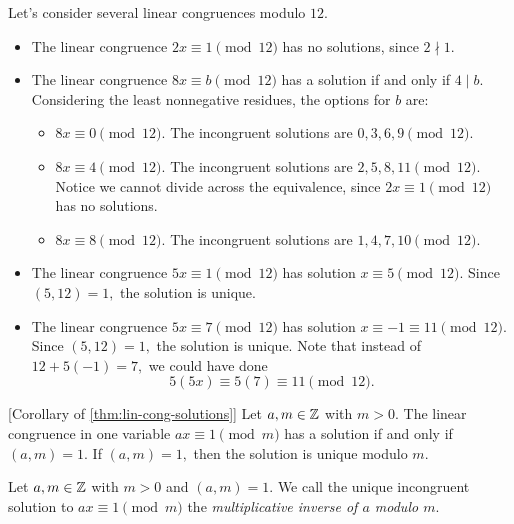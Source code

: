 \documentclass{ximera}
\begin{document}
\begin{example} 
	Let's consider several linear congruences modulo $12.$
	\begin{itemize}
		\item The linear congruence $2x\equiv 1\pmod{12}$ has no solutions, since $2\nmid1.$
		\item The linear congruence $8x\equiv b \pmod{12}$ has a solution if and only if $4\mid b$. Considering the least nonnegative residues, the options for $b$ are:
			\begin{itemize}
			\item $8x\equiv 0\pmod{12}.$ The incongruent solutions are $0,3,6,9\pmod{12}.$
			\item $8x\equiv 4\pmod{12}.$ The incongruent solutions are $2,5,8,11\pmod{12}.$ Notice we cannot divide across the equivalence, since $2x\equiv 1\pmod{12}$ has no solutions. 
			\item $8x\equiv 8\pmod{12}.$ The incongruent solutions are $1,4,7,10\pmod{12}.$ 
			\end{itemize}
		\item The linear congruence $5x\equiv 1 \pmod{12}$ has solution $x\equiv 5\pmod{12}.$ Since $(5,12)=1,$ the solution is unique.
		\item The linear congruence $5x\equiv 7 \pmod{12}$ has solution $x\equiv -1\equiv 11\pmod{12}.$ Since $(5,12)=1,$ the solution is unique. Note that instead of $12+5(-1)=7,$ we could have done 
		\[5(5x)\equiv 5(7)\equiv 11\pmod{12}.\]
	\end{itemize}
\end{example}




\begin{corollary}\label{cor:condition-invertible}[Corollary of \autoref{thm:lin-cong-solutions}]
    Let $a,m\in\mathbb Z$ with $m>0.$ The linear congruence in one variable $ax\equiv 1\pmod{m}$ has a solution if and only if $(a,m)=1$. If $(a,m)=1,$ then the solution is unique modulo $m$. 
\end{corollary}

\begin{defn}\label{defn:mult-inv} Let $a,m\in\mathbb Z$ with $m>0$ and $(a,m)=1.$
    We call the unique incongruent solution to $ax\equiv 1\pmod m$ the \emph{multiplicative inverse of $a$ modulo $m$}.
\end{defn}
\end{document}
